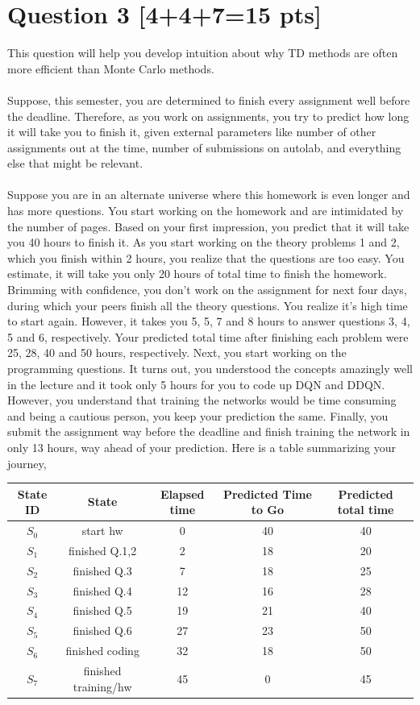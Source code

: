 \documentclass[12pt]{article}
\begin{document}
\section*{Question 3 \textbf{[4+4+7=15 pts]}}
This question will help you develop intuition about why TD methods are often more efficient than Monte Carlo methods.\\\\
Suppose, this semester, you are determined to finish every assignment well before the deadline. Therefore, as you work on assignments, you try to predict how long it will take you to finish it, given external parameters like number of other assignments out at the time, number of submissions on autolab, and everything else that might be relevant. \\\\
Suppose you are in an alternate universe where this homework is even longer and has more questions.  You start working on the homework and are intimidated by the number of pages. Based on your first impression, you predict that it will take you 40 hours to finish it. As you start working on the theory problems 1 and 2, which you finish within 2 hours, you realize that the questions are too easy. You estimate, it will take you only 20 hours of total time to finish the homework. Brimming with confidence, you don't work on the assignment for next four days, during which your peers finish all the theory questions. You realize it's high time to start again. However, it takes you 5, 5, 7 and 8 hours to answer questions 3, 4, 5 and 6, respectively. Your predicted total time after finishing each problem were 25, 28, 40 and 50 hours, respectively. Next, you start working on the programming questions. It turns out, you understood the concepts amazingly well in the lecture and it took only 5 hours for you to code up DQN and DDQN. However, you understand that training the networks would be time consuming and being a cautious person, you keep your prediction the same. Finally, you submit the assignment way before the deadline and finish training the network in only 13 hours, way ahead of your prediction. Here is a table summarizing your journey,

\begin{center}
\begin{tabular}{ | c | c | c | c | c | }
 \hline
 State ID & State & Elapsed time & Predicted Time to Go & Predicted total time \\ 
 \hline
 $S_0$ & start hw & 0 & 40 & 40 \\
 \hline
 $S_1$ & finished Q.1,2 & 2 & 18 & 20 \\
 \hline
 $S_2$ & finished Q.3  & 7 & 18 & 25 \\ 
 \hline
 $S_3$ & finished Q.4 & 12 & 16 & 28 \\
 \hline
 $S_4$ & finished Q.5 & 19 & 21 & 40 \\
 \hline
 $S_5$ & finished Q.6 & 27 & 23 & 50 \\
 \hline
 $S_6$ & finished coding & 32 & 18 & 50 \\
 \hline
 $S_7$ & finished training/hw & 45 & 0 & 45 \\
\hline
\end{tabular}
\end{center}
\end{document}
